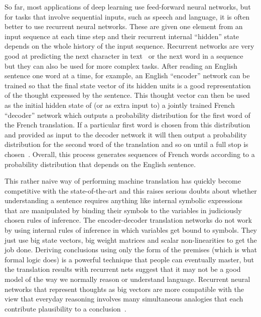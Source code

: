 \documentclass[10pts]{article}
\begin{document}
So far, most applications of deep learning use feed-forward neural
networks, but for tasks that involve sequential inputs, such as speech
and language, it is often better to use recurrent neural
networks. These are given one element from an input 
sequence at each time step and their recurrent internal
``hidden'' state depends on the whole history of the input
sequence. Recurrent networks are very good at predicting the next
character in text~\citep{Sutskever-et-al-ICML2011} or the next
word in a sequence~\citep{Mikolov-et-al-NIPS2013} but they can also be
used for more complex tasks.  After reading an English sentence one
word at a time, for example, an English ``encoder'' network can be
trained so that the final state vector of its hidden units is a good
representation of the thought expressed by the sentence.  This thought
vector can then be used as the initial hidden state of (or as extra
input to)  a jointly trained French ``decoder'' network which outputs a
probability distribution for the first word of the French
translation. If a particular first word is chosen from this distribution and provided as input to the decoder network it will
then output a probability distribution for the second word of the
translation and so on until a full stop is
chosen~\citep{Bahdanau-et-al-arxiv2014,Sutskever-et-al-NIPS2014}.
Overall, this process generates sequences of French words according to
a probability distribution that depends on the English sentence.

This rather naive way of performing machine translation has quickly become
competitive with the state-of-the-art and this raises serious doubts about
whether understanding a sentence requires anything like internal symbolic
expressions that are manipulated by binding their symbols to the variables
in judiciously chosen rules of inference.  The encoder-decoder translation
networks do not work by using internal rules of inference in which
variables get bound to symbols. They just use big state vectors, big weight
matrices and scalar non-linearities to get the job done.  Deriving conclusions using only the form of the premises (which is
what formal logic does) is a powerful
technique that people can eventually master, but the translation
results with recurrent nets suggest that it may not be a good model of
the way we normally reason or understand language. Recurrent neural
networks that represent thoughts as big vectors are more compatible with
the view that everyday reasoning involves many simultaneous analogies that
each contribute plausibility to a conclusion~\citep{metaphors,Rogers+McClelland-book2004}.
\end{document}
